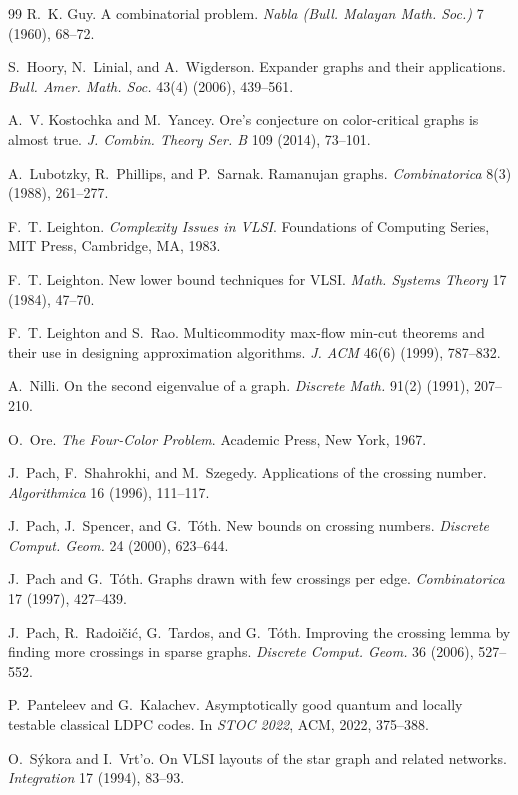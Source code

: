 \documentclass[11pt,a4paper]{article}
\theoremstyle{definition}
\begin{document}
\begin{thebibliography}{99}
R.~K. Guy.
\newblock A combinatorial problem.
\newblock \emph{Nabla (Bull. Malayan Math. Soc.)} 7 (1960), 68--72.

S.~Hoory, N.~Linial, and A.~Wigderson.
\newblock Expander graphs and their applications.
\newblock \emph{Bull. Amer. Math. Soc.} 43(4) (2006), 439--561.

A.~V. Kostochka and M.~Yancey.
\newblock Ore's conjecture on color-critical graphs is almost true.
\newblock \emph{J. Combin. Theory Ser. B} 109 (2014), 73--101.

A.~Lubotzky, R.~Phillips, and P.~Sarnak.
\newblock Ramanujan graphs.
\newblock \emph{Combinatorica} 8(3) (1988), 261--277.

F.~T. Leighton.
\newblock \emph{Complexity Issues in VLSI}.
\newblock Foundations of Computing Series, MIT Press, Cambridge,
MA, 1983.

F.~T. Leighton.
\newblock New lower bound techniques for VLSI.
\newblock \emph{Math. Systems Theory} 17 (1984), 47--70.

F.~T. Leighton and S.~Rao.
\newblock Multicommodity max-flow min-cut theorems and their use in
designing approximation algorithms.
\newblock \emph{J. ACM} 46(6) (1999), 787--832.

A.~Nilli.
\newblock On the second eigenvalue of a graph.
\newblock \emph{Discrete Math.} 91(2) (1991), 207--210.

O.~Ore.
\newblock \emph{The Four-Color Problem}.
\newblock Academic Press, New York, 1967.

J.~Pach, F.~Shahrokhi, and M.~Szegedy.
\newblock Applications of the crossing number.
\newblock \emph{Algorithmica} 16 (1996), 111--117.

J.~Pach, J.~Spencer, and G.~T\'oth.
\newblock New bounds on crossing numbers.
\newblock \emph{Discrete Comput. Geom.} 24 (2000), 623--644.

J.~Pach and G.~T\'oth.
\newblock Graphs drawn with few crossings per edge.
\newblock \emph{Combinatorica} 17 (1997), 427--439.

J.~Pach, R.~Radoi\v{c}i\'c, G.~Tardos, and G.~T\'oth.
\newblock Improving the crossing lemma by finding more crossings in
sparse graphs.
\newblock \emph{Discrete Comput. Geom.} 36 (2006), 527--552.

P.~Panteleev and G.~Kalachev.
\newblock Asymptotically good quantum and locally testable classical LDPC codes.
\newblock In \emph{STOC 2022}, ACM, 2022, 375--388.

O.~S\'ykora and I.~Vrt'o.
\newblock On VLSI layouts of the star graph and related networks.
\newblock \emph{Integration} 17 (1994), 83--93.

\end{thebibliography}
\end{document}
